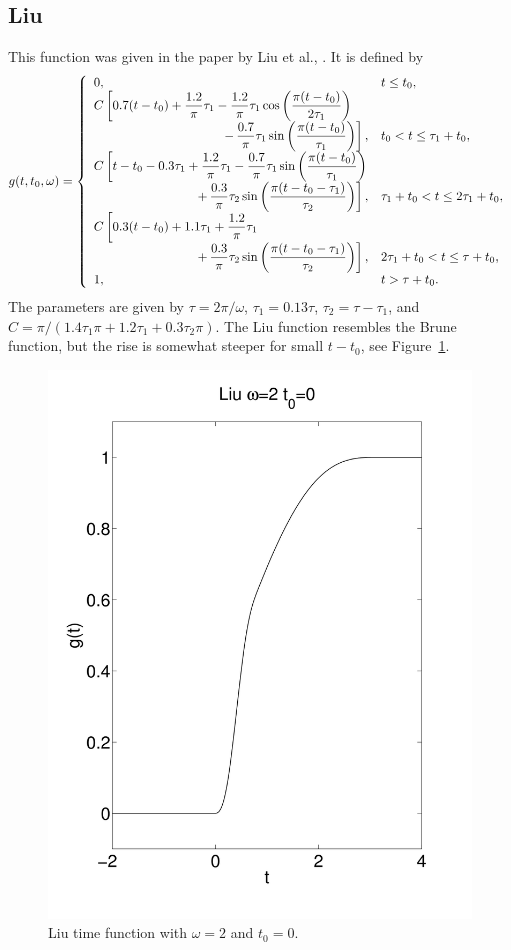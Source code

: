 \documentclass[11pt]{report}
\renewcommand{\arraystretch}{1.3}
\begin{document}
\subsection{Liu}
\renewcommand{\arraystretch}{1.5}
This function was given in the paper by Liu et al., \cite{liuetal_2006}. 
It is defined by 
\[
g(t,t_0,\omega) = \left\{ 
\begin{array}{ll}
  0, & t \leq t_0, \\
  C\left[0.7(t-t_0) + \dfrac{1.2}{\pi}\tau_1 - \dfrac{1.2}{\pi}\tau_1
  \cos\left(\dfrac{\pi (t-t_0)}{2\tau_1}\right) \right. & \\
     \hfill \left. -\,\dfrac{0.7}{\pi}\tau_1\sin\left(\dfrac{\pi (t-t_0)}{\tau_1}\right)\right],  & 
     t_0 < t \leq \tau_1+t_0, \\
%
  C\left[t-t_0-0.3\tau_1+\dfrac{1.2}{\pi}\tau_1-\dfrac{0.7}{\pi}\tau_1\sin\left(\dfrac{\pi
    (t-t_0)}{\tau_1}\right)\right. & \\ 
    \hfill
    \left. +\,\dfrac{0.3}{\pi}\tau_2\sin\left(\dfrac{\pi(t-t_0-\tau_1)}{\tau_2}\right)\right], &  
    \tau_1+t_0 < t \leq 2\tau_1+t_0, \\
%
  C\left[0.3(t-t_0)+1.1\tau_1+\dfrac{1.2}{\pi}\tau_1\right. & \\
    \hfill
    \left. +\,\dfrac{0.3}{\pi}\tau_2\sin\left(\dfrac{\pi(t-t_0-\tau_1)}{\tau_2}\right)\right], & 
    2\tau_1+t_0 < t \leq \tau+t_0, \\
  1,  &  t > \tau +t_0.
\end{array} \right.
\]
\noindent The parameters are given by $\tau=2\pi/\omega$, $\tau_1=0.13\tau$, $\tau_2 = \tau-\tau_1$,
and $C=\pi/(1.4\tau_1\pi+1.2\tau_1+0.3\tau_2\pi)$.  The Liu function resembles the Brune function,
but the rise is somewhat steeper for small $t-t_0$, see Figure~\ref{fig:liu}.
\begin{figure}
\begin{centering}
  \includegraphics[width=0.4\linewidth]{f12-liu.png}
  \caption{Liu time function with $\omega=2$ and $t_0=0$.}
  \label{fig:liu}
\end{centering}
\end{figure}  
\end{document}
